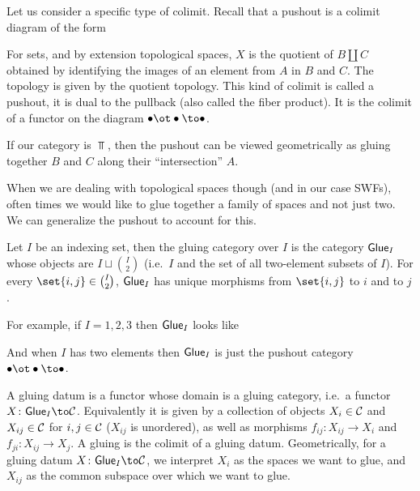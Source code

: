\eproof

Let us consider a specific type of colimit.
Recall that a pushout is a colimit diagram of the form

\centerline{}

For sets, and by extension topological spaces, $X$ is the quotient of $B\amalg C$ obtained by identifying the images of an element from $A$ in $B$ and $C$.
The topology is given by the quotient topology.
This kind of colimit is called a {\emphcolor pushout}, it is dual to the {\emphcolor pullback} (also called the {\emphcolor fiber product}).
It is the colimit of a functor on the diagram $\bul\ot\bul\to\bul$.

If our category is $\Top$, then the pushout can be viewed geometrically as gluing together $B$ and $C$ along their ``intersection'' $A$.

When we are dealing with topological spaces though (and in our case SWFs), often times we would like to glue together a family of spaces and not just two.
We can generalize the pushout to account for this.

\bdefn

    Let $I$ be an indexing set, then the {\emphcolor gluing category} over $I$ is the category ${\sf Glue}_I$ whose objects are $I\sqcup\binom I2$ (i.e.\ $I$ and the set of all two-element
    subsets of $I$).
    For every $\set{i,j}\in\binom I2$, ${\sf Glue}_I$ has unique morphisms from $\set{i,j}$ to $i$ and to $j$.

\edefn

For example, if $I={1,2,3}$ then ${\sf Glue}_I$ looks like

\bigskip
\centerline{}

And when $I$ has two elements then ${\sf Glue}_I$ is just the pushout category $\bul\ot\bul\to\bul$.

A {\emphcolor gluing datum} is a functor whose domain is a gluing category, i.e.\ a functor $X\colon\glue_I\to\C$.
Equivalently it is given by a collection of objects $X_i\in{{\cal C}}$ and $X_{ij}\in{{\cal C}}$ for $i,j\in{{\cal C}}$ ($X_{ij}$ is unordered), as well as morphisms $f_{ij}\colon X_{ij}\to X_i$ and $f_{ji}\colon X_{ij}\to X_j$.
A {\emphcolor gluing} is the colimit of a gluing datum.
Geometrically, for a gluing datum $X\colon\glue_I\to\C$, we interpret $X_i$ as the spaces we want to glue, and $X_{ij}$ as the common subspace over which we want to glue.

